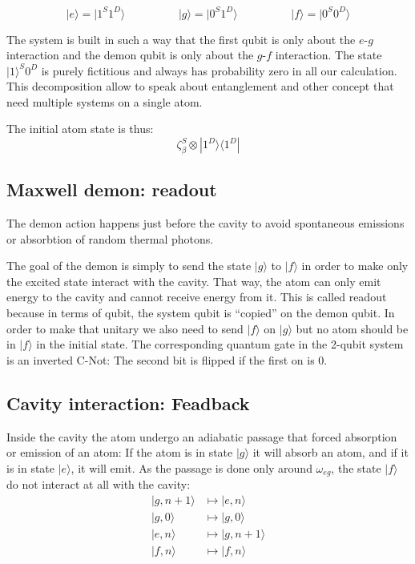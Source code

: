 \documentclass[10pt,a4paper]{report}
\theoremstyle{plain}
\theoremstyle{definition}
\theoremstyle{remark}
\newcommand{\ket}[1]{|#1\rangle}
\newcommand{\bra}[1]{\langle#1|}
\begin{document}
\[\ket e = \ket {1^S1^D} \hspace{2cm} \ket g = \ket{0^S1^D} \hspace{2cm} \ket f
  = \ket{0^S0^D}\]

The system is built in such a way that the first qubit is only about the $e$-$g$
interaction and the demon qubit is only about the $g$-$f$ interaction. The state
$\ket 1^S0^D$ is purely fictitious and always has probability zero in all our
calculation. This decomposition allow to speak about entanglement and other
concept that need multiple systems on a single atom.

The initial atom state is thus:
\[\zeta_\beta^S \otimes \ket {1^D} \bra {1^D}\]

\subsection{Maxwell demon: readout}

The demon action happens just before the cavity to avoid spontaneous emissions or
absorbtion of random thermal photons.

The goal of the demon is simply to send the state $\ket g$ to $\ket f$ in order
to make only the excited state interact with the cavity. That way, the atom can
only emit energy to the cavity and cannot receive energy from it. This is called
readout because in terms of qubit, the system qubit is ``copied'' on the demon
qubit. In order to make that unitary we also need to send $\ket f$ on $\ket g$
but no atom should be in $\ket f$ in the initial state. The corresponding quantum
gate in the 2-qubit system is an inverted C-Not: The second bit is flipped if
the first on is 0.

\subsection{Cavity interaction: Feadback}

Inside the cavity the atom undergo an adiabatic passage that forced absorption
or emission of an atom: If the atom is in state $\ket g$ it will absorb an atom,
and if it is in state $\ket e$, it will emit. As the passage is done only around
$\omega_{eg}$, the state $\ket f$ do not interact at all with the cavity:
\begin{align*}
  \ket{g,n+1} &\mapsto \ket{e,n}\\
  \ket{g,0} &\mapsto \ket{g,0}\\
  \ket{e,n} &\mapsto \ket{g,n+1}\\
  \ket{f,n} &\mapsto \ket{f,n}\\
\end{align*}
\end{document}
